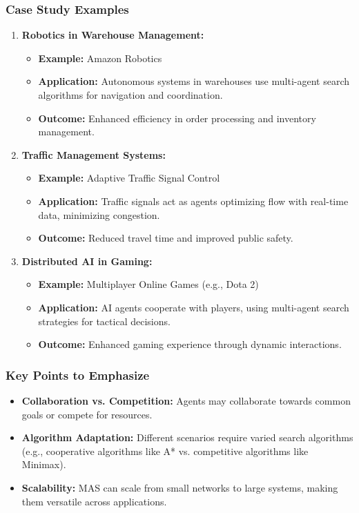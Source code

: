 \documentclass[aspectratio=169]{beamer}
\begin{document}
\begin{frame}[fragile]
    \frametitle{Case Study Examples}
    \begin{enumerate}
        \item \textbf{Robotics in Warehouse Management:}
            \begin{itemize}
                \item \textbf{Example:} Amazon Robotics
                \item \textbf{Application:} Autonomous systems in warehouses use multi-agent search algorithms for navigation and coordination.
                \item \textbf{Outcome:} Enhanced efficiency in order processing and inventory management.
            \end{itemize}
        
        \item \textbf{Traffic Management Systems:}
            \begin{itemize}
                \item \textbf{Example:} Adaptive Traffic Signal Control
                \item \textbf{Application:} Traffic signals act as agents optimizing flow with real-time data, minimizing congestion.
                \item \textbf{Outcome:} Reduced travel time and improved public safety.
            \end{itemize}
        
        \item \textbf{Distributed AI in Gaming:}
            \begin{itemize}
                \item \textbf{Example:} Multiplayer Online Games (e.g., Dota 2)
                \item \textbf{Application:} AI agents cooperate with players, using multi-agent search strategies for tactical decisions.
                \item \textbf{Outcome:} Enhanced gaming experience through dynamic interactions.
            \end{itemize}
    \end{enumerate}
\end{frame}

\begin{frame}[fragile]
    \frametitle{Key Points to Emphasize}
    \begin{itemize}
        \item \textbf{Collaboration vs. Competition:} Agents may collaborate towards common goals or compete for resources.
        \item \textbf{Algorithm Adaptation:} Different scenarios require varied search algorithms (e.g., cooperative algorithms like A* vs. competitive algorithms like Minimax).
        \item \textbf{Scalability:} MAS can scale from small networks to large systems, making them versatile across applications.
    \end{itemize}
\end{frame}
\end{document}
